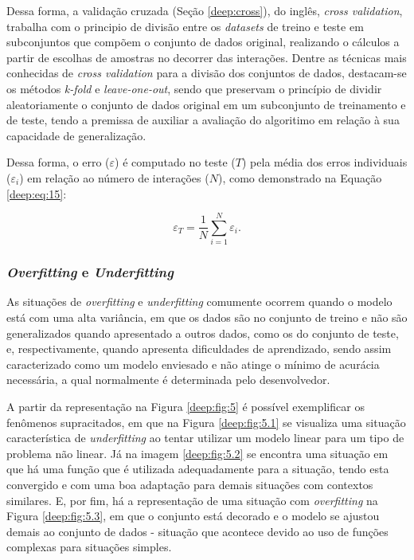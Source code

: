 Dessa forma, a validação cruzada (Seção \ref{deep:cross}), do inglês, \textit{cross validation}, trabalha com o principio de divisão entre os \textit{datasets} de treino e teste em subconjuntos que compõem o conjunto de dados original, realizando o cálculos a partir de escolhas de amostras no decorrer das interações. Dentre as técnicas mais conhecidas de \textit{cross validation} para a divisão dos conjuntos de dados, destacam-se os métodos \textit{k-fold} e \textit{leave-one-out}, sendo que preservam o princípio de dividir aleatoriamente o conjunto de dados original em um subconjunto de treinamento e de teste, tendo a premissa de auxiliar a avaliação do algoritimo em relação à sua capacidade de generalização.

Dessa forma, o erro ($\varepsilon$) é computado no teste ($T$) pela média dos erros individuais ($\varepsilon_i$) em relação ao número de interações ($N$), como demonstrado na Equação \ref{deep:eq:15}:

\begin{equation}
    \label{deep:eq:15}
    \varepsilon_T = \frac{1}{N} \sum_{i=1}^{N} \varepsilon_i.
\end{equation}


\subsubsection{\textit{Overfitting} e \textit{Underfitting}}
\label{deep:overunder}

As situações de \textit{overfitting} e \textit{underfitting} comumente ocorrem quando o modelo está com uma alta variância, em que os dados são  no conjunto de treino e não são generalizados quando apresentado a outros dados, como os do conjunto de teste, e, respectivamente, quando apresenta dificuldades de aprendizado, sendo assim caracterizado como um modelo enviesado e não atinge o mínimo de acurácia necessária, a qual normalmente é determinada pelo desenvolvedor.

A partir da representação na Figura \ref{deep:fig:5} é possível exemplificar os fenômenos supracitados, em que na Figura \ref{deep:fig:5.1} se visualiza uma situação característica de \textit{underfitting} ao tentar utilizar um modelo linear para um tipo de problema não linear. Já na imagem \ref{deep:fig:5.2} se encontra uma situação em que há uma função que é utilizada adequadamente para a situação, tendo esta convergido e com uma boa adaptação para demais situações com contextos similares. E, por fim, há a representação de uma situação com \textit{overfitting} na Figura \ref{deep:fig:5.3}, em que o conjunto está decorado e o modelo se ajustou demais ao conjunto de dados - situação que acontece devido ao uso de funções complexas para situações simples.

